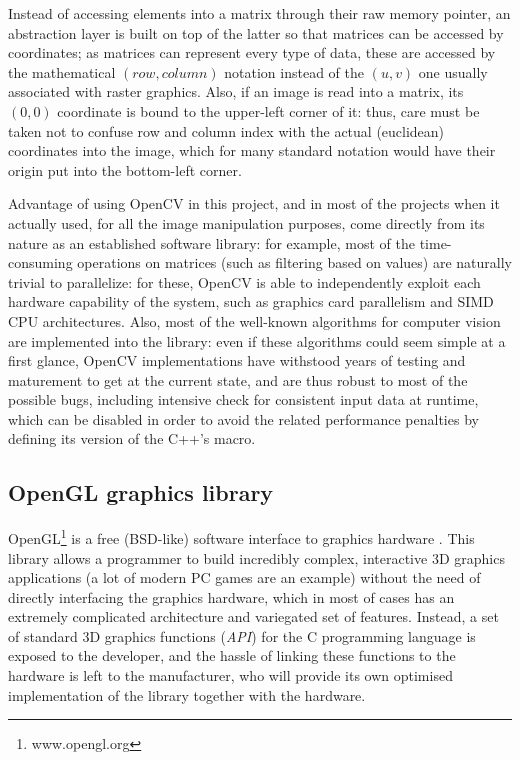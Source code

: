 Instead of accessing elements into a matrix through their raw memory
pointer, an abstraction layer is built on top of the latter so that
matrices can be accessed by coordinates; as matrices can represent
every type of data, these are accessed by the mathematical  $(row, column)$ notation
instead of the $(u,v)$ one usually associated with raster
graphics. Also, if an image is read into a matrix, its $(0,0)$
coordinate is bound to the upper-left corner of it: thus, care must be
taken not to confuse row and column index with the actual (euclidean)
coordinates into the image, which for many standard notation would
have their origin put into the bottom-left corner. 

Advantage of using OpenCV in this project, and in most of the projects
when it actually used, for all the image
manipulation purposes, come directly from its nature as an established
software library: for example, most of the time-consuming operations
on matrices (such as filtering based on values) are naturally trivial
to parallelize: for these, OpenCV is able to independently exploit
each hardware capability of the system, such as graphics card
parallelism and SIMD CPU architectures. Also, most of the well-known
algorithms for computer vision are implemented into the library: even
if these algorithms could seem simple at a first glance, OpenCV
implementations have withstood years of testing and maturement to get
at the current state, and are thus robust to most of the possible
bugs, including intensive check for consistent input data at runtime,
which can be disabled in order to avoid the related performance
penalties by defining its version of the C++'s  macro.

\subsection{OpenGL graphics library} \label{sec:opengl-intro}
OpenGL\footnote{www.opengl.org} is a free (BSD-like) software interface to graphics hardware \cite{opengl-book}. This
library allows a programmer to build incredibly complex, interactive 3D graphics
applications (a lot of modern PC games are an example) without the need of
directly interfacing the graphics hardware, which in most of cases has an
extremely complicated architecture and variegated set of features. Instead, a
set of standard 3D graphics functions (\emph{API}) for the C programming
language is exposed to the developer, and the hassle of linking these
functions to the hardware is left to the manufacturer, who will provide its own
optimised implementation of the library together with the hardware.

